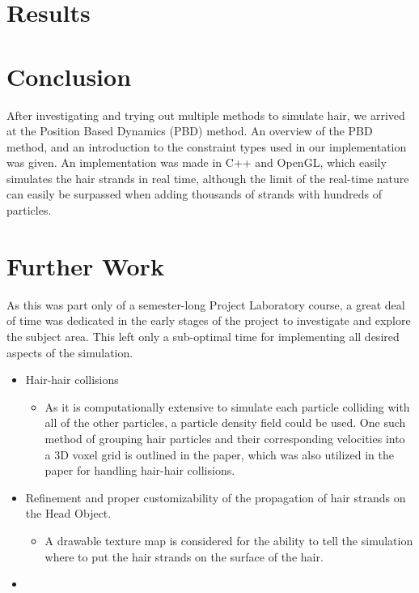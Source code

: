 \documentclass[sigplan,screen,nonacm]{acmart}
\begin{document}
\section{Results}

\section{Conclusion}
After investigating and trying out multiple methods to simulate hair, we arrived
at the Position Based Dynamics (PBD) method. An overview of the PBD method, and
an introduction to the constraint types used in our implementation was given.
An implementation was made in C++ and OpenGL, which easily simulates the hair
strands in real time, although the limit of the real-time nature can easily be
surpassed when adding thousands of strands with hundreds of particles.

\section{Further Work}
As this was part only of a semester-long Project Laboratory course, a great deal
of time was dedicated in the early stages of the project to investigate and
explore the subject area. This left only a sub-optimal time for implementing all
desired aspects of the simulation.

\begin{itemize}
    \item Hair-hair collisions
        \begin{itemize} 
            \item As it is computationally extensive to simulate each particle
                colliding with all of the other particles, a particle density
                field could be used. One such method of grouping hair particles
                and their corresponding velocities into a 3D voxel grid is
                outlined in the \cite{PixarVolumetricHair} paper, which was also
                utilized in the \citet{FTLHair} paper for handling hair-hair
                collisions.
        \end{itemize}
    \item Refinement and proper customizability of the propagation of hair
        strands on the Head Object. 
        \begin{itemize}
            \item A drawable texture map is considered for the ability to
                tell the simulation where to put the hair strands on the
                surface of the hair.
        \end{itemize}
    \item 
\end{itemize}
\end{document}
